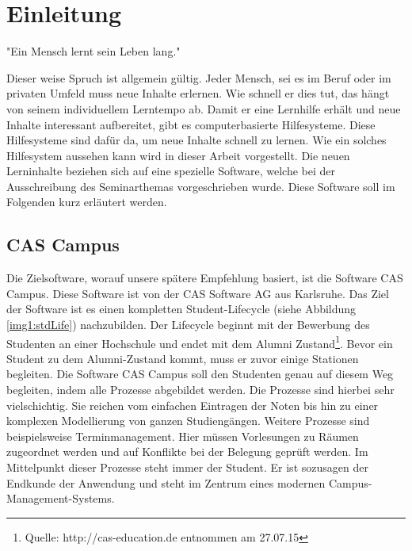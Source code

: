 
\chapter{Einleitung}
\label{ch:Introduction}
"Ein Mensch lernt sein Leben lang." \par

Dieser weise Spruch ist allgemein gültig. Jeder Mensch, sei es im Beruf oder im privaten Umfeld muss neue Inhalte erlernen. Wie schnell er dies tut, das hängt von seinem individuellem Lerntempo ab. Damit er eine Lernhilfe erhält und neue Inhalte interessant aufbereitet, gibt es computerbasierte Hilfesysteme. Diese Hilfesysteme sind dafür da, um neue Inhalte schnell zu lernen. Wie ein solches Hilfesystem aussehen kann wird in dieser Arbeit vorgestellt. Die neuen Lerninhalte beziehen sich auf eine spezielle Software, welche bei der Ausschreibung des Seminarthemas vorgeschrieben wurde. Diese Software soll im Folgenden kurz erläutert werden.




\section{CAS Campus}
Die Zielsoftware, worauf unsere spätere Empfehlung basiert, ist die Software CAS Campus. Diese Software ist von der CAS Software AG aus Karlsruhe. Das Ziel der Software ist es einen kompletten Student-Lifecycle (siehe Abbildung \ref{img1:stdLife}) nachzubilden. Der Lifecycle beginnt mit der Bewerbung des Studenten an einer Hochschule und endet mit dem Alumni Zustand\footnote{Quelle: http://cas-education.de entnommen am 27.07.15}. Bevor ein Student zu dem Alumni-Zustand kommt, muss er zuvor einige Stationen begleiten. Die Software CAS Campus soll den Studenten genau auf diesem Weg begleiten, indem alle Prozesse abgebildet werden. Die Prozesse sind hierbei sehr vielschichtig. Sie reichen vom einfachen Eintragen der Noten bis hin zu einer komplexen Modellierung von ganzen Studiengängen. Weitere Prozesse sind beispielsweise Terminmanagement. Hier müssen Vorlesungen zu Räumen zugeordnet werden und auf Konflikte bei der Belegung geprüft werden. Im Mittelpunkt dieser Prozesse steht immer der Student. Er ist sozusagen der Endkunde der Anwendung und steht im Zentrum eines modernen Campus-Management-Systems.\par



